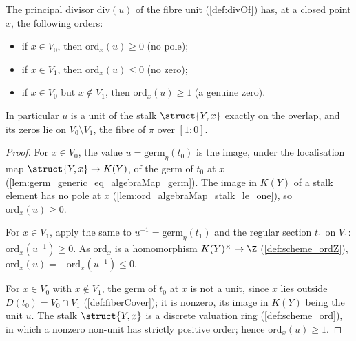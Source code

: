 \begin{theorem}
  \label{thm:fiberCoordUnit_order}
  \leanok
  The principal divisor \(\mathrm{div}(u)\) of the fibre unit (\ref{def:divOf}) has, at a closed
  point \(x\), the following orders:
  \begin{itemize}
    \item if \(x \in V_0\), then \(\mathrm{ord}_x(u) \ge 0\) (no pole);
    \item if \(x \in V_1\), then \(\mathrm{ord}_x(u) \le 0\) (no zero);
    \item if \(x \in V_0\) but \(x \notin V_1\), then \(\mathrm{ord}_x(u) \ge 1\) (a genuine zero).
  \end{itemize}
  In particular \(u\) is a unit of the stalk \(\struct{Y,x}\) exactly on the overlap, and its zeros
  lie on \(V_0 \setminus V_1\), the fibre of \(\pi\) over \([1 : 0]\).
\end{theorem}
\begin{proof}
  \leanok
  For \(x \in V_0\), the value \(u = \mathrm{germ}_{\eta}(t_0)\) is the image, under the localisation
  map \(\struct{Y,x} \to K(Y)\), of the germ of \(t_0\) at \(x\)
  (\ref{lem:germ_generic_eq_algebraMap_germ}). The image in \(K(Y)\) of a stalk element has no pole
  at \(x\) (\ref{lem:ord_algebraMap_stalk_le_one}), so \(\mathrm{ord}_x(u) \ge 0\).

  For \(x \in V_1\), apply the same to \(u^{-1} = \mathrm{germ}_{\eta}(t_1)\) and the regular section
  \(t_1\) on \(V_1\): \(\mathrm{ord}_x(u^{-1}) \ge 0\). As \(\mathrm{ord}_x\) is a homomorphism
  \(K(Y)^{\times} \to \Z\) (\ref{def:scheme_ordZ}), \(\mathrm{ord}_x(u) = -\mathrm{ord}_x(u^{-1}) \le
  0\).

  For \(x \in V_0\) with \(x \notin V_1\), the germ of \(t_0\) at \(x\) is not a unit, since \(x\)
  lies outside \(D(t_0) = V_0 \cap V_1\) (\ref{def:fiberCover}); it is nonzero, its image in \(K(Y)\)
  being the unit \(u\). The stalk \(\struct{Y,x}\) is a discrete valuation ring (\ref{def:scheme_ord}),
  in which a nonzero non-unit has strictly positive order; hence \(\mathrm{ord}_x(u) \ge 1\).
\end{proof}

